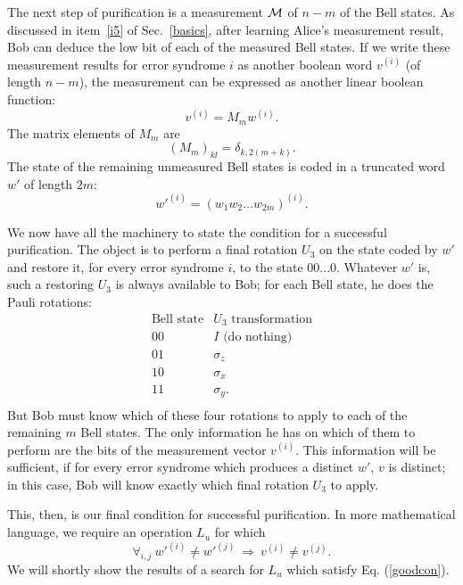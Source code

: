 The next step of purification is a measurement $\cal M$
of $n\!-\!m$ of the Bell states.  As discussed in item~\ref{i5} of
Sec.~\ref{basics}, after learning Alice's measurement result, Bob can
deduce the low bit of each of the measured Bell states.  If we write
these measurement results for error syndrome $i$ as another boolean
word $v^{(i)}$ (of length $n\!-\!m$), the measurement can be expressed as
another linear boolean function:
\begin{equation}
v^{(i)}=M_mw^{(i)}.
\end{equation}
The matrix elements of $M_m$ are
\begin{equation}
(M_m)_{kl}=\delta_{k,2(m+k)}.
\end{equation}
The state of the remaining unmeasured Bell states is coded in a truncated
word $w'$ of length $2m$:
\begin{equation}
w'^{(i)}=(w_1w_2...w_{2m})^{(i)}.
\end{equation}
 
We now have all the machinery to state the condition for a successful
purification.  The object is to perform a final rotation $U_3$ on the
state coded by $w'$ and restore it, for every error syndrome $i$, to
the state $00...0$.  Whatever $w'$ is, such a restoring $U_3$ is always
available to Bob; for each Bell state, he does the Pauli rotations:
\begin{equation}
\begin{array}{cl}
\mbox{Bell state} & U_3 \mbox{ transformation} \\
00 & I \mbox{ (do nothing)} \\
01 & \sigma_z \\
10 & \sigma_x \\
11 & \sigma_y. \\ \end{array}
\end{equation}
But Bob must know which of these four rotations to apply to each
of the remaining $m$ Bell states.  The only information he has on which
of them to perform are the bits of the measurement vector $v^{(i)}$.
This information will be sufficient, if for every error syndrome which
produces a distinct $w'$, $v$ is distinct; in this case, Bob will
know exactly which final rotation $U_3$ to apply.
 
This, then, is our final condition for successful purification.  In
more mathematical language, we require an operation $L_u$ for which
\begin{equation}
\forall_{i,j}\ w'^{(i)}\ne w'^{(j)}\ \Longrightarrow\ v^{(i)}\ne v^{(j)}.
\label{goodcon}
\end{equation}
We will shortly show the results of a search for $L_u$ which satisfy
Eq. (\ref{goodcon}).
 

